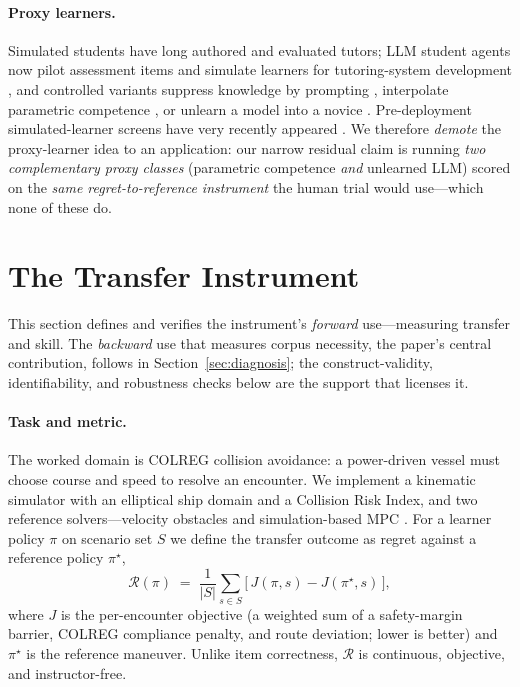 \documentclass{article}
\newcommand{\regret}{\mathcal{R}}
\begin{document}
\paragraph{Proxy learners.} Simulated students have long authored and evaluated tutors; LLM
student agents now pilot assessment items \citep{luwang2024} and simulate learners for
tutoring-system development \citep{agent4edu2025}, and controlled variants suppress knowledge
by prompting \citep{apartsin2026}, interpolate parametric competence \citep{ps2_2026}, or
unlearn a model into a novice \citep{song2026unlearn}. Pre-deployment simulated-learner
screens have very recently appeared \citep{llmjudgeaudit2026,educlaw2026}. We therefore
\emph{demote} the proxy-learner idea to an application: our narrow residual claim is running
\emph{two complementary proxy classes} (parametric competence \emph{and} unlearned LLM)
scored on the \emph{same regret-to-reference instrument} the human trial would use---which
none of these do.

\section{The Transfer Instrument}
\label{sec:instrument}
This section defines and verifies the instrument's \emph{forward} use---measuring transfer and skill.
The \emph{backward} use that measures corpus necessity, the paper's central contribution, follows in
Section~\ref{sec:diagnosis}; the construct-validity, identifiability, and robustness checks below are
the support that licenses it.

\paragraph{Task and metric.} The worked domain is COLREG collision avoidance: a
power-driven vessel must choose course and speed to resolve an encounter. We implement a
kinematic simulator with an elliptical ship domain and a Collision Risk Index, and two
reference solvers---velocity obstacles \citep{fiorini1998vo} and simulation-based
MPC \citep{johansen2016sbmpc}. For a learner policy $\pi$ on scenario set $S$ we define the
transfer outcome as regret against a reference policy $\pi^\star$,
\begin{equation}
  \regret(\pi) \;=\; \frac{1}{|S|}\sum_{s \in S}\big[\, J(\pi, s) - J(\pi^\star, s)\,\big],
\end{equation}
where $J$ is the per-encounter objective (a weighted sum of a safety-margin barrier, COLREG
compliance penalty, and route deviation; lower is better) and $\pi^\star$ is the reference
maneuver. Unlike item correctness, $\regret$ is continuous, objective, and instructor-free.
\end{document}
